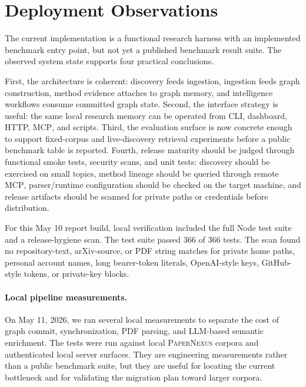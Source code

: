 \documentclass[11pt]{article}
\newcommand{\papernexus}{\textsc{PaperNexus}}
\newcommand{\mcp}{\textsc{MCP}}
\begin{document}
\section{Deployment Observations}

The current implementation is a functional research harness with an implemented benchmark entry point, but not yet a published benchmark result suite. The observed system state supports four practical conclusions.

First, the architecture is coherent: discovery feeds ingestion, ingestion feeds graph construction, method evidence attaches to graph memory, and intelligence workflows consume committed graph state. Second, the interface strategy is useful: the same local research memory can be operated from CLI, dashboard, HTTP, \mcp{}, and scripts. Third, the evaluation surface is now concrete enough to support fixed-corpus and live-discovery retrieval experiments before a public benchmark table is reported. Fourth, release maturity should be judged through functional smoke tests, security scans, and unit tests: discovery should be exercised on small topics, method lineage should be queried through remote \mcp{}, parser/runtime configuration should be checked on the target machine, and release artifacts should be scanned for private paths or credentials before distribution.

For this May 10 report build, local verification included the full Node test suite and a release-hygiene scan. The test suite passed 366 of 366 tests. The scan found no repository-text, arXiv-source, or PDF string matches for private home paths, personal account names, long bearer-token literals, OpenAI-style keys, GitHub-style tokens, or private-key blocks.

\paragraph{Local pipeline measurements.}
On May 11, 2026, we ran several local measurements to separate the cost of graph commit, synchronization, PDF parsing, and LLM-based semantic enrichment. The tests were run against local \papernexus{} corpora and authenticated local server surfaces. They are engineering measurements rather than a public benchmark suite, but they are useful for locating the current bottleneck and for validating the migration plan toward larger corpora.
\end{document}
